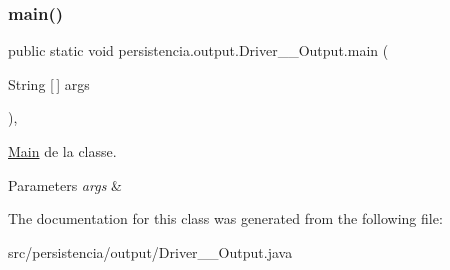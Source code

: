 \subsubsection{\texorpdfstring{main()}{main()}}
{\footnotesize\ttfamily public static void persistencia.\+output.\+Driver\+\_\+\+\_\+\+Output.\+main (\begin{DoxyParamCaption}\item[{String \mbox{[}$\,$\mbox{]}}]{args }\end{DoxyParamCaption})\hspace{0.3cm}{\ttfamily [inline]}, {\ttfamily [static]}}



\hyperlink{classMain}{Main} de la classe. 


\begin{DoxyParams}{Parameters}
{\em args} & \\
\hline
\end{DoxyParams}


The documentation for this class was generated from the following file\+:\begin{DoxyCompactItemize}
\item 
src/persistencia/output/Driver\+\_\+\+\_\+\+Output.\+java\end{DoxyCompactItemize}
